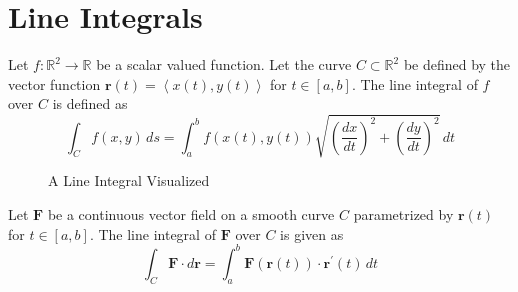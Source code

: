 \section{Line Integrals}
\begin{definition}
    Let \(f:\mathbb{R}^{2}\to \mathbb{R} \) be a scalar valued function. Let the curve \(C \subset \mathbb{R}^2\) be defined by the vector function \(\mathbf{r}(t)= \left\langle x(t),y(t) \right\rangle \) for \(t\in[a,b]\). The line integral of \(f\) over \(C\) is defined as  
    \[
        \int_C f(x,y)\,ds = \int_a^b f(x(t),y(t))\sqrt{\left( \frac{d x}{d t} \right)^2 + \left( \frac{d y}{d t} \right)^2  } \,dt
    \]
\end{definition}
\begin{figure}[ht]
   \centering
   \caption{A Line Integral Visualized}
\end{figure}
\begin{definition}
    Let \(\mathbf{F}\) be a continuous vector field on a smooth curve \(C\) parametrized by \(\mathbf{r}(t)\) for \(t\in[a,b]\). The line integral of \(\mathbf{F}\) over \(C\) is given as 
    \[
        \int_C \mathbf{F}\cdot d \mathbf{r} = \int_a^{b} \mathbf{F}(\mathbf{r}(t)) \cdot \mathbf{r}^{\prime} (t)\,dt
    \]
\end{definition}